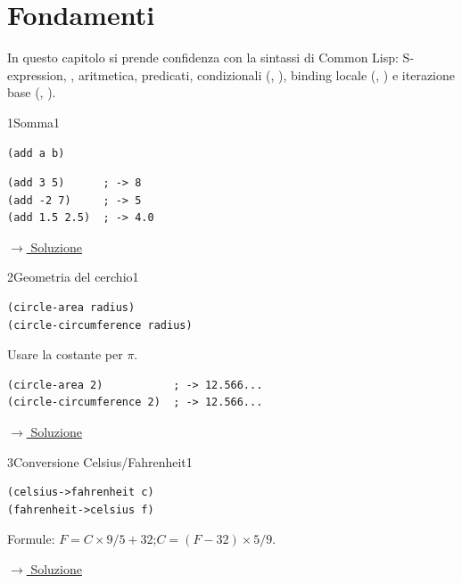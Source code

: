 ﻿%

\setcounter{section}{0}
\section{Fondamenti}

\noindent
In questo capitolo si prende confidenza con la sintassi di
Common Lisp: S-expression, , aritmetica, predicati,
condizionali (, ), binding locale (,
) e iterazione base (, ).

\bigskip

\label{ex:1}
\begin{essbox}{1}{Somma}{1}
\nopagebreak
\begin{lstlisting}
(add a b)
\end{lstlisting}
\begin{lstlisting}
(add 3 5)      ; -> 8
(add -2 7)     ; -> 5
(add 1.5 2.5)  ; -> 4.0
\end{lstlisting}


\small\color{black!55}\hyperref[sol:1]{$\rightarrow$ Soluzione}\normalsize\color{black}
\end{essbox}

\label{ex:2}
\begin{stdbox}{2}{Geometria del cerchio}{1}
\nopagebreak
\begin{lstlisting}
(circle-area radius)
(circle-circumference radius)
\end{lstlisting}
Usare la costante  per $\pi$.
\begin{lstlisting}
(circle-area 2)           ; -> 12.566...
(circle-circumference 2)  ; -> 12.566...
\end{lstlisting}


\small\color{black!55}\hyperref[sol:2]{$\rightarrow$ Soluzione}\normalsize\color{black}
\end{stdbox}

\label{ex:3}
\begin{stdbox}{3}{Conversione Celsius/Fahrenheit}{1}
\nopagebreak
\begin{lstlisting}
(celsius->fahrenheit c)
(fahrenheit->celsius f)
\end{lstlisting}
Formule: $F = C \times 9/5 + 32$;\quad $C = (F - 32) \times 5/9$.


\small\color{black!55}\hyperref[sol:3]{$\rightarrow$ Soluzione}\normalsize\color{black}
\end{stdbox}

